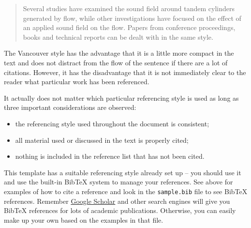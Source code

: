 \begin{quote}
Several studies have examined the sound field around tandem cylinders generated by flow\cite{fitzpatrick2003flow,finnegan2010experimental}, while other investigations have focused on the effect of an applied sound field on the flow\cite{hall2003vortex}. Papers from conference proceedings\cite{jordan2001array}, books\cite{paidoussis2010fluid} and technical reports\cite{reyes2007power} can be dealt with in the same style.
\end{quote}

The Vancouver style has the advantage that it is a little more compact in the text and does not distract from the flow of the sentence if there are a lot of citations. However, it has the disadvantage that it is not immediately clear to the reader what particular work has been referenced.

It actually does not matter which particular referencing style is used as long as three important considerations are observed:
\begin{itemize}
\item the referencing style used throughout the document is consistent;
\item all material used or discussed in the text is properly cited;
\item nothing is included in the reference list that has not been cited.
\end{itemize}

This template has a suitable referencing style already set up -- you should use it and use the built-in BibTeX system to manage your references. See above for examples of how to cite a reference and look in the \texttt{sample.bib} file to see BibTeX references. Remember \href{http://scholar.google.com}{Google Scholar} and other search engines will give you BibTeX references for lots of academic publications. Otherwise, you can easily make up your own based on the examples in that file.

